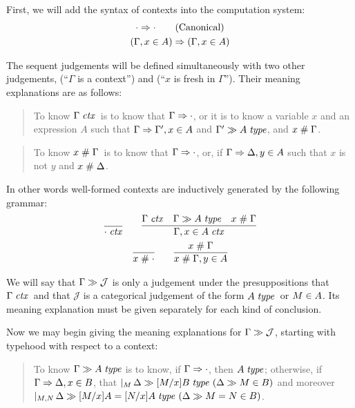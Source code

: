 \documentclass[main.tex]{subfiles}
\begin{document}
First, we will add the syntax of contexts into the computation system:
\begin{gather*}
  \cdot\Rightarrow\cdot\tag{Canonical}\\
  (\Gamma,x\in A)\Rightarrow(\Gamma,x\in A)
\end{gather*}

The sequent judgements will be defined simultaneously with two other
judgements, \framebox{$\isctx{\Gamma}$} (``$\Gamma$ is a context'')
and  (``$x$ is fresh in
$\Gamma$''). Their meaning explanations are as follows:

\begin{quote}
  To know $\Gamma\;\mathit{ctx}$\ is to know that $\Gamma\Rightarrow\cdot$, or it is to know
  a variable $x$ and an expression $A$ such that $\Gamma\Rightarrow\Gamma', x\in A$
  and $\Gamma'\gg A\;\mathit{type}$, and $x\mathrel{\#}\Gamma$.
\end{quote}

\begin{quote}
  To know $x\mathrel{\#}\Gamma$\ is to know that
  $\Gamma\Rightarrow\cdot$, or, if $\Gamma\Rightarrow\Delta,y\in A$
  such that $x$ is not $y$ and $x\mathrel{\#}\Delta$.
\end{quote}

In other words well-formed contexts are inductively generated by the
following grammar:
\begin{gather*}
  \infer{\isctx\cdot}{}
  \qquad
  \infer{
    \isctx{\Gamma,\ver{x}{A}}
  }{
    \isctx\Gamma &
    \sequent{\Gamma}{\isset{A}} &
    \fresh{x}{\Gamma}
  }\\
  \infer{\fresh{x}{\cdot}}{}
  \qquad
  \infer{
    \fresh{x}{\Gamma,\ver{y}{A}}
  }{
    \fresh{x}{\Gamma}
  }
\end{gather*}

We will say that $\Gamma\gg\mathcal{J}$ is only a judgement
under the presuppositions that $\Gamma\;\mathit{ctx}$\ and that $\mathcal{J}$
is a categorical judgement of the form $A\;\mathit{type}$\ or
$M\in A$. Its meaning explanation must be given separately for
each kind of conclusion.

Now we may begin giving the meaning explanations for
$\Gamma\gg\mathcal{J}$, starting with typehood with respect to a context:

\begin{quote}

  To know $\Gamma\gg A\;\mathit{type}$ is to know, if
$\Gamma\Rightarrow\cdot$, then $A\;\mathit{type}$; otherwise, if
$\Gamma\Rightarrow\Delta,x\in B$, that
$\lvert_{M}\,\Delta\gg[M/x]B\;\mathit{type}\ (\Delta\gg M\in B)$
and moreover
$\lvert_{M,N}\,\Delta\gg[M/x]A=[N/x]A\;\mathit{type}\ (\Delta\gg M=N\in B)$.

\end{quote}
\end{document}
